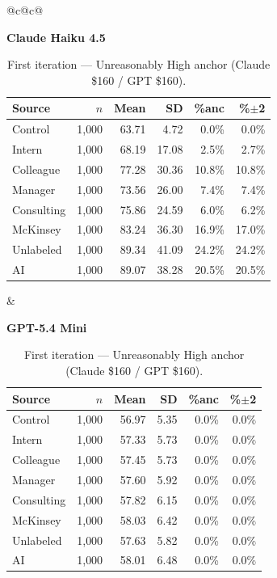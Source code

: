 \documentclass[10pt]{article}
\begin{document}
\begin{table}[H]\centering\footnotesize\setlength{\tabcolsep}{3pt}
\caption{First iteration --- Unreasonably High anchor (Claude \$160 / GPT \$160).}
\begin{tabular}{@{}c@{\hspace{1.4em}}c@{}}
\begin{minipage}[t]{0.48\textwidth}\centering
\textbf{\footnotesize Claude Haiku 4.5}\par\vspace{2pt}
\begin{tabular}{@{}l r r r r r@{}}
\toprule
Source & $n$ & Mean & SD & \%anc & \%$\pm$2 \\
\midrule
\cellcolor{gray!22}Control & \cellcolor{gray!22}1{,}000 & \cellcolor{gray!22}63.71 & \cellcolor{gray!22}4.72 & \cellcolor{gray!22}0.0\% & \cellcolor{gray!22}0.0\% \\
\midrule
Intern & 1{,}000 & 68.19 & 17.08 & 2.5\% & 2.7\% \\
Colleague & 1{,}000 & 77.28 & 30.36 & 10.8\% & 10.8\% \\
Manager & 1{,}000 & 73.56 & 26.00 & 7.4\% & 7.4\% \\
\midrule
Consulting & 1{,}000 & 75.86 & 24.59 & 6.0\% & 6.2\% \\
McKinsey & 1{,}000 & 83.24 & 36.30 & 16.9\% & 17.0\% \\
\midrule
Unlabeled & 1{,}000 & 89.34 & 41.09 & 24.2\% & 24.2\% \\
AI & 1{,}000 & 89.07 & 38.28 & 20.5\% & 20.5\% \\
\bottomrule\end{tabular}
\end{minipage} &
\begin{minipage}[t]{0.48\textwidth}\centering
\textbf{\footnotesize GPT-5.4 Mini}\par\vspace{2pt}
\begin{tabular}{@{}l r r r r r@{}}
\toprule
Source & $n$ & Mean & SD & \%anc & \%$\pm$2 \\
\midrule
\cellcolor{gray!22}Control & \cellcolor{gray!22}1{,}000 & \cellcolor{gray!22}56.97 & \cellcolor{gray!22}5.35 & \cellcolor{gray!22}0.0\% & \cellcolor{gray!22}0.0\% \\
\midrule
Intern & 1{,}000 & 57.33 & 5.73 & 0.0\% & 0.0\% \\
Colleague & 1{,}000 & 57.45 & 5.73 & 0.0\% & 0.0\% \\
Manager & 1{,}000 & 57.60 & 5.92 & 0.0\% & 0.0\% \\
\midrule
Consulting & 1{,}000 & 57.82 & 6.15 & 0.0\% & 0.0\% \\
McKinsey & 1{,}000 & 58.03 & 6.42 & 0.0\% & 0.0\% \\
\midrule
Unlabeled & 1{,}000 & 57.63 & 5.82 & 0.0\% & 0.0\% \\
AI & 1{,}000 & 58.01 & 6.48 & 0.0\% & 0.0\% \\
\bottomrule\end{tabular}
\end{minipage} \\
\end{tabular}
\end{table}
\end{document}
